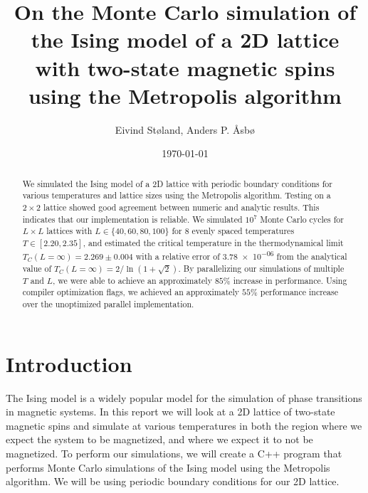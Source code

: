 \documentclass[reprint,english,notitlepage]{revtex4-1}  %
\begin{document}
\title{On the Monte Carlo simulation of the Ising model of a 2D lattice with two-state magnetic spins using the Metropolis algorithm}   %
\author{Eivind Støland, Anders P. Åsbø}               %
\date{\today}                             %
\noaffiliation                            %

\begin{abstract}
We simulated the Ising model of a 2D lattice with periodic boundary conditions for various temperatures and lattice sizes using the Metropolis algorithm. Testing on a \(2 \times 2\) lattice showed good agreement between numeric and analytic results. This indicates that our implementation is reliable. We simulated \(10^{7}\) Monte Carlo cycles for \(L\times L\) lattices with \(L \in \{40, 60, 80, 100\}\) for \(8\) evenly spaced temperatures \(T \in [2.20, 2.35]\), and estimated the critical temperature in the thermodynamical limit $T_C(L=\infty) = 2.269 \pm 0.004$ with a relative error of \num{3.78e-06} from the analytical value of $T_C(L=\infty) = 2/\ln(1 + \sqrt{2})$. By parallelizing our simulations of multiple \(T\) and \(L\), we were able to achieve an approximately \(85\%\) increase in performance. Using compiler optimization flags, we achieved an approximately \(55\%\) performance increase over the unoptimized parallel implementation.

\end{abstract}

\maketitle                                %


\tableofcontents

\section{Introduction} \label{sec:I}

The Ising model is a widely popular model for the simulation of phase transitions in magnetic systems. In this report we will look at a 2D lattice of two-state magnetic spins and simulate at various temperatures in both the region where we expect the system to be magnetized, and where we expect it to not be magnetized. To perform our simulations, we will create a C++ program that performs Monte Carlo simulations of the Ising model using the Metropolis algorithm. We will be using periodic boundary conditions for our 2D lattice.
\end{document}
